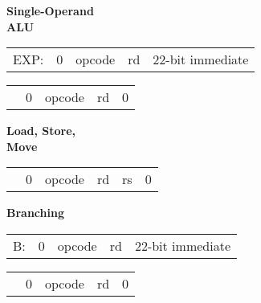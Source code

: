 \documentclass{article}
\begin{document}
\bigskip\bigskip

\begin{minipage}[t]{0.3\textwidth}
	\begin{center}
		\textbf{Single-Operand\\ ALU}
	\end{center}
\end{minipage}
\begin{minipage}[t]{110mm}	
	\begin{tabular}{p{12mm}|C{2.5mm}|C{12.5mm}|C{10mm}|C{65.3mm}|}
		 EXP: & 0 & opcode & rd & 22-bit immediate \\
	\end{tabular}

	\medskip

	\begin{tabular}{p{12mm}|C{2.5mm}|C{12.5mm}|C{10mm}|C{65.3mm}|}
		 & 0 & opcode & rd & 0 \\
	\end{tabular}
\end{minipage}

\bigskip\bigskip\bigskip

\begin{minipage}[t]{0.3\textwidth}
	\begin{center}
		\textbf{Load, Store, \\ Move}
	\end{center}
\end{minipage}
\begin{minipage}[t]{110mm}

	\begin{tabular}{p{12mm}|C{2.5mm}|C{12.5mm}|C{10mm}|C{10mm}|C{55.15mm}|}
		 & 0 & opcode & rd & rs & 0 \\
	\end{tabular}

	\end{minipage}

\bigskip\bigskip\bigskip

\begin{minipage}[t]{0.3\textwidth}
	\begin{center}
		\textbf{Branching}
	\end{center}
\end{minipage}
\begin{minipage}[t]{110mm}
	\begin{tabular}{p{12mm}|C{2.5mm}|C{12.5mm}|C{10mm}|C{65.3mm}|}
		\quad B: & 0 & opcode & rd & 22-bit immediate \\
	\end{tabular}

	\medskip

	\begin{tabular}{p{12mm}|C{2.5mm}|C{12.5mm}|C{10mm}|C{65.3mm}|}
		 & 0 & opcode & rd & 0 \\
	\end{tabular}

\end{minipage}
\end{document}
